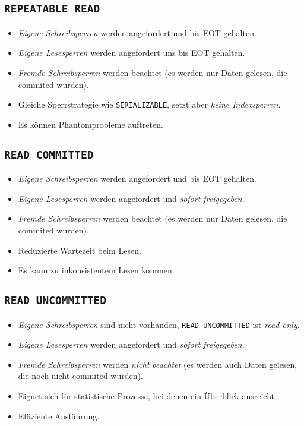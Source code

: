 		\subsection{\lstinline|REPEATABLE READ|} %
			\begin{itemize}
				\item \textit{Eigene Schreibsperren} werden angefordert und bis EOT gehalten.
				\item \textit{Eigene Lesesperren} werden angefordert uns bis EOT gehalten.
				\item \textit{Fremde Schreibsperren} werden beachtet (es werden nur Daten gelesen, die commited wurden).
				\item Gleiche Sperrstrategie wie \lstinline|SERIALIZABLE|, setzt aber \textit{keine Indexsperren}.
				\item Es können Phantomprobleme auftreten.
			\end{itemize}

		\subsection{\lstinline|READ COMMITTED|} %
			\begin{itemize}
				\item \textit{Eigene Schreibsperren} werden angefordert und bis EOT gehalten.
				\item \textit{Eigene Lesesperren} werden angefordert und \textit{sofort freigegeben}.
				\item \textit{Fremde Schreibsperren} werden beachtet (es werden nur Daten gelesen, die commited wurden).
				\item Reduzierte Wartezeit beim Lesen.
				\item Es kann zu inkonsistentem Lesen kommen.
			\end{itemize}

		\subsection{\lstinline|READ UNCOMMITTED|} %
			\begin{itemize}
				\item \textit{Eigene Schreibsperren} sind nicht vorhanden, \lstinline|READ UNCOMMITTED| ist \textit{read only}.
				\item \textit{Eigene Lesesperren} werden angefordert und \textit{sofort freigegeben}.
				\item \textit{Fremde Schreibsperren} werden \textit{nicht beachtet} (es werden auch Daten gelesen, die noch nicht commited wurden).
				\item Eignet sich für statistische Prozesse, bei denen ein Überblick ausreicht.
				\item Effiziente Ausführung.
			\end{itemize}

